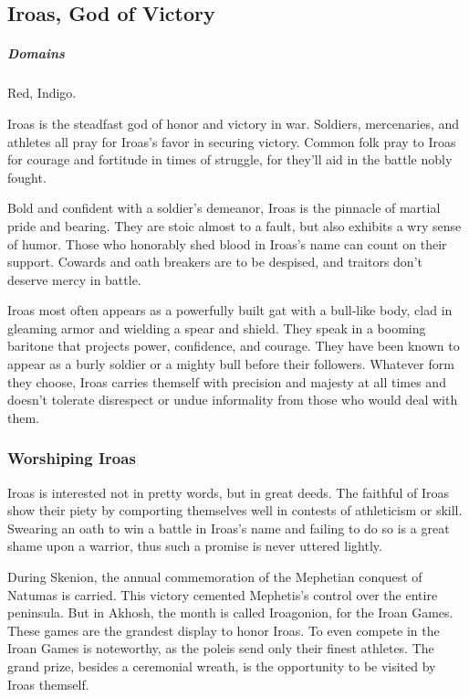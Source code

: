 \subsection*{Iroas, God of Victory} \label{ssec::iroas}
    \subparagraph{Domains} Red, Indigo.

    Iroas is the steadfast god of honor and victory in war.
    Soldiers, mercenaries, and athletes all pray for Iroas's favor in securing victory.
    Common folk pray to Iroas for courage and fortitude in times of struggle, for they'll aid in the battle nobly fought.

    Bold and confident with a soldier's demeanor, Iroas is the pinnacle of martial pride and bearing.
    They are stoic almost to a fault, but also exhibits a wry sense of humor.
    Those who honorably shed blood in Iroas's name can count on their support.
    Cowards and oath breakers are to be despised, and traitors don't deserve mercy in battle.

    Iroas most often appears as a powerfully built gat with a bull-like body, clad in gleaming armor and wielding a spear and shield.
    They speak in a booming baritone that projects power, confidence, and courage.
    They have been known to appear as a burly soldier or a mighty bull before their followers.
    Whatever form they choose, Iroas carries themself with precision and majesty at all times and doesn't tolerate disrespect or undue informality from those who would deal with them.


    \subsubsection{Worshiping Iroas}
        Iroas is interested not in pretty words, but in great deeds.
        The faithful of Iroas show their piety by comporting themselves well in contests of athleticism or skill.
        Swearing an oath to win a battle in Iroas's name and failing to do so is a great shame upon a warrior, thus such a promise is never uttered lightly.

        During Skenion, the annual commemoration of the Mephetian conquest of Natumas is carried.
        This victory cemented Mephetis's control over the entire peninsula.
        But in Akhosh, the month is called Iroagonion, for the Iroan Games.
        These games are the grandest display to honor Iroas.
        To even compete in the Iroan Games is noteworthy, as the poleis send only their finest athletes.
        The grand prize, besides a ceremonial wreath, is the opportunity to be visited by Iroas themself.

